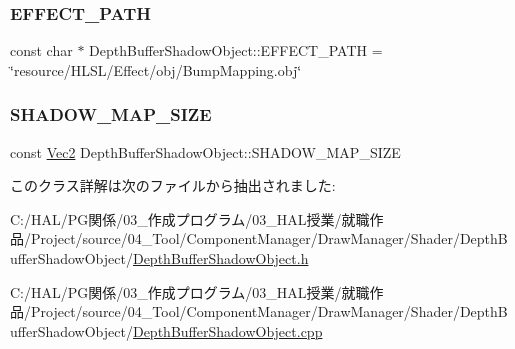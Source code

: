 \subsubsection{\texorpdfstring{E\+F\+F\+E\+C\+T\+\_\+\+P\+A\+TH}{EFFECT\_PATH}}
{\footnotesize\ttfamily const char $\ast$ Depth\+Buffer\+Shadow\+Object\+::\+E\+F\+F\+E\+C\+T\+\_\+\+P\+A\+TH = \char`\"{}resource/H\+L\+SL/Effect/obj/Bump\+Mapping.\+obj\char`\"{}\hspace{0.3cm}{\ttfamily [static]}}

\mbox{\label{class_depth_buffer_shadow_object_aa7a8ac55e3de545dacb0cfde57fd1017}} 
\subsubsection{\texorpdfstring{S\+H\+A\+D\+O\+W\+\_\+\+M\+A\+P\+\_\+\+S\+I\+ZE}{SHADOW\_MAP\_SIZE}}
{\footnotesize\ttfamily const \mbox{\hyperlink{_vector3_d_8h_a5ef6e95dfc5f9d3820b71772d99bbc25}{Vec2}} Depth\+Buffer\+Shadow\+Object\+::\+S\+H\+A\+D\+O\+W\+\_\+\+M\+A\+P\+\_\+\+S\+I\+ZE\hspace{0.3cm}{\ttfamily [static]}}



このクラス詳解は次のファイルから抽出されました\+:\begin{DoxyCompactItemize}
\item 
C\+:/\+H\+A\+L/\+P\+G関係/03\+\_\+作成プログラム/03\+\_\+\+H\+A\+L授業/就職作品/\+Project/source/04\+\_\+\+Tool/\+Component\+Manager/\+Draw\+Manager/\+Shader/\+Depth\+Buffer\+Shadow\+Object/\mbox{\hyperlink{_depth_buffer_shadow_object_8h}{Depth\+Buffer\+Shadow\+Object.\+h}}\item 
C\+:/\+H\+A\+L/\+P\+G関係/03\+\_\+作成プログラム/03\+\_\+\+H\+A\+L授業/就職作品/\+Project/source/04\+\_\+\+Tool/\+Component\+Manager/\+Draw\+Manager/\+Shader/\+Depth\+Buffer\+Shadow\+Object/\mbox{\hyperlink{_depth_buffer_shadow_object_8cpp}{Depth\+Buffer\+Shadow\+Object.\+cpp}}\end{DoxyCompactItemize}

